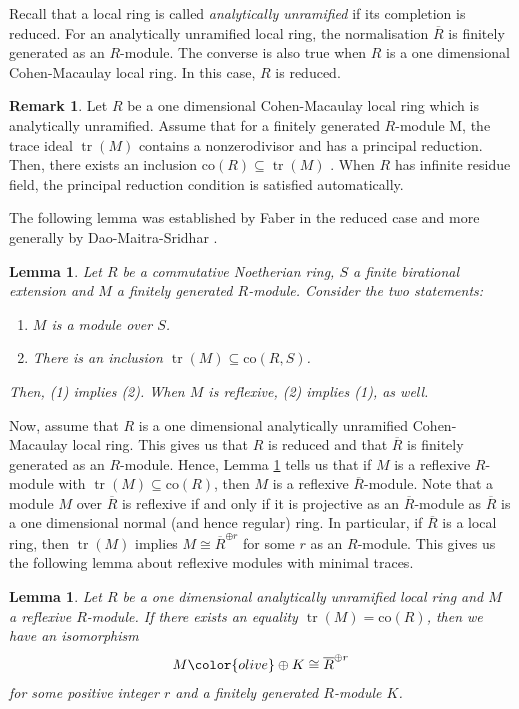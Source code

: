 \documentclass[12pt]{amsart}
\newcommand\co{\mathrm{co}}
\newtheorem{lemma}[theorem]{Lemma}
\theoremstyle{definition}
\newtheorem{remark}[theorem]{Remark}
\DeclareMathOperator{\tr}{\mathrm{tr}}
\newcommand\oznewtext[1]{{\color{olive} #1}} %
\begin{document}
Recall that a local ring is called \textit{analytically unramified} if its completion is reduced. For an analytically unramified local ring, the normalisation $\overline{R}$ is finitely generated as an $R$-module. The converse is also true when $R$ is a one dimensional Cohen-Macaulay local ring. In this case, $R$ is reduced. 
\begin{remark}
    Let $R$ be a one dimensional Cohen-Macaulay local ring which is analytically unramified. Assume that for a finitely generated $R$-module M, the trace ideal $\tr(M)$ contains a nonzerodivisor and has a principal reduction. Then, there exists an inclusion $\co(R) \subseteq \tr(M)$ \cite[Corollary 3.6]{Dao-Maitra-Sridhar}. When $R$ has infinite residue field, the principal reduction condition is satisfied automatically.
\end{remark}
\iffalse
The following lemma was established by Faber \cite[Theorem 3.5]{Faber} in the reduced case and more generally by Dao-Maitra-Sridhar \cite[Theorem 2.9]{Dao-Maitra-Sridhar}.
\begin{lemma}\label{faber-lemma}
    Let $R$ be a commutative Noetherian ring, $S$ a finite birational extension and $M$ a finitely generated $R$-module. Consider the two statements:
    \begin{enumerate}
        \item $M$ is a module over $S$.
        \item There is an inclusion $\tr(M) \subseteq \co(R,S)$. 
    \end{enumerate}
    Then, (1) implies (2). When $M$ is reflexive, (2) implies (1), as well.
\end{lemma}
\oznewtext{Now, assume that $R$ is a one dimensional analytically unramified Cohen-Macaulay local ring. This gives us that $R$ is reduced and that $\overline{R}$ is finitely generated as an $R$-module. Hence, Lemma \ref{faber-lemma} tells us that if $M$ is a reflexive $R$-module with $\tr(M) \subseteq \co(R)$, then $M$ is a reflexive $\overline{R}$-module. Note that a module $M$ over $\overline{R}$ is reflexive if and only if it is projective as an $\overline{R}$-module as $\overline{R}$ is a one dimensional normal (and hence regular) ring. In particular, if $\overline{R}$ is a local ring, then $\tr(M)$ implies $M \cong \overline{R}^{\oplus r}$ for some $r$ as an $R$-module.}
This gives us the following lemma about reflexive modules with minimal traces.
\begin{lemma}\label{main-lemma}
    Let $R$ be a one dimensional analytically unramified \oznewtext{local ring }and $M$ a reflexive $R$-module. If there exists an equality $\tr(M) = \co(R)$, then we have an isomorphism 
    \begin{align*}
    M \oznewtext{\oplus K} \cong \overline{R}^{\oplus r}
    \end{align*}
    \oznewtext{for some positive integer $r$ and a finitely generated $R$-module $K$.}
\end{lemma}
\end{document}
